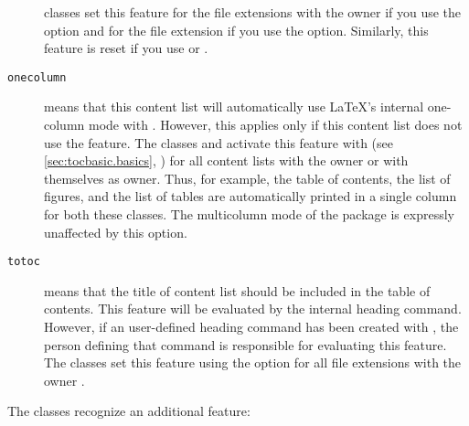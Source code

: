 \begin{description}
  \KOMAScript{} classes set this feature for the file extensions with the
  owner  if you use the
   option and for the file
  extension  if you use the
   option. Similarly, this feature
  is reset if you use %
   or
  .
\item[\texttt{onecolumn}] \leavevmode{}%
  means that this content list will automatically use \LaTeX's internal
  one-column mode with .
  However, this applies only if this content list does
  not use the  feature. The
  \KOMAScript{} classes  and  activate this
  feature with  (see
  \autoref{sec:tocbasic.basics}, )
  for all content lists with the owner  or with themselves as
  owner. Thus, for example, the table of contents, the list of figures, and
  the list of tables are automatically printed in a single column for both
  these classes. The multicolumn mode of the
   package is expressly unaffected by
  this option.
\item[\texttt{totoc}] means that the title of content list should be included
  in the table of contents. This feature will be evaluated by the internal
  heading command. However, if an user-defined heading command has been
  created with , the person defining
  that command is responsible for evaluating this feature. The \KOMAScript{}
  classes set this feature using the %
   option for all file extensions with
  the owner .
\end{description}
The \KOMAScript{} classes recognize an additional feature:
